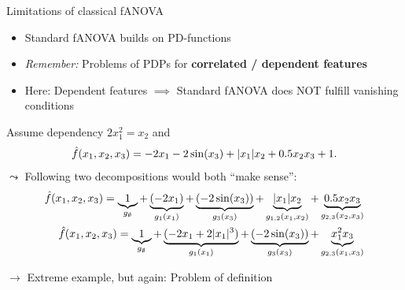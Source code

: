 \documentclass[10pt,compress,t,notes=noshow, xcolor=table]{beamer}
\begin{document}
\begin{frame}{Limitations of classical fANOVA}

    \begin{itemize}
    
        \item Standard fANOVA builds on PD-functions
        
        \item \textit{Remember:} Problems of PDPs for \textbf{correlated / dependent features}
        \item Here: Dependent features $\implies$ Standard fANOVA does NOT fulfill vanishing conditions %
    \end{itemize}
    \pause
    \begin{example}
        Assume dependency \(2x_1^2 = x_2\) and
        \begin{equation*}
            \hat{f}(x_1, x_2, x_3) = - 2x_1 - 2\sin(x_3) + |x_1|x_2 + 0.5 x_2 x_3 + 1.
        \end{equation*}
        $\leadsto$ Following two decompositions would both ``make sense'':
        \begin{align*}
            \hat{f}(x_1, x_2, x_3)
            = \underbrace{1}_{g_\emptyset}
                + \underbrace{(- 2x_1)}_{g_1(x_1)} 
                + \underbrace{(- 2\sin(x_3))}_{g_3(x_3)}
                + \underbrace{|x_1|x_2}_{g_{1,2}(x_1, x_2)} 
                + \underbrace{0.5 x_2 x_3}_{g_{2,3}(x_2, x_3)} \\
            \hat{f}(x_1, x_2, x_3)
            = \underbrace{1}_{g_\emptyset}
                + \underbrace{(- 2x_1 + 2 |x_1|^3)}_{g_1(x_1)} 
                + \underbrace{(- 2\sin(x_3))}_{g_3(x_3)}
                + \underbrace{x_1^2 x_3}_{g_{2,3}(x_1, x_3)}
        \end{align*}
    \end{example}
    \pause
    $\rightarrow$ Extreme example, but again: Problem of definition


    
    
\end{frame}
\end{document}
